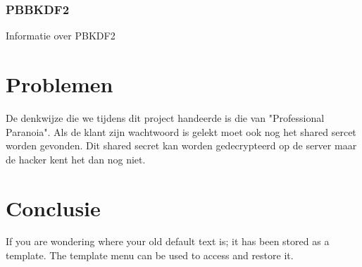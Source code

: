 \documentclass[11pt]{article}
\begin{document}
\subsubsection{PBBKDF2}
\label{sec:pbkdf2}
Informatie over PBKDF2
\label{sec:totp}
\section{Problemen}
De denkwijze die we tijdens dit project handeerde is die van "Professional Paranoia".
Als de klant zijn wachtwoord is gelekt moet ook nog het shared sercet worden gevonden. Dit shared secret kan worden gedecrypteerd op de server maar de hacker kent het dan nog niet.
\section{Conclusie}
If you are wondering where your old default text is; it has been stored as a template. The template menu can be used to access and restore it. 

{}

\end{document}
